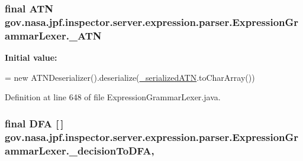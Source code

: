 \subsubsection[{\texorpdfstring{\+\_\+\+A\+TN}{_ATN}}]{\setlength{\rightskip}{0pt plus 5cm}final A\+TN gov.\+nasa.\+jpf.\+inspector.\+server.\+expression.\+parser.\+Expression\+Grammar\+Lexer.\+\_\+\+A\+TN\hspace{0.3cm}{\ttfamily [static]}}\hypertarget{classgov_1_1nasa_1_1jpf_1_1inspector_1_1server_1_1expression_1_1parser_1_1_expression_grammar_lexer_a01682bbb89e1c13f1f5df9764056ae9a}{}\label{classgov_1_1nasa_1_1jpf_1_1inspector_1_1server_1_1expression_1_1parser_1_1_expression_grammar_lexer_a01682bbb89e1c13f1f5df9764056ae9a}
{\bfseries Initial value\+:}
\begin{DoxyCode}
=
    \textcolor{keyword}{new} ATNDeserializer().deserialize(\hyperlink{classgov_1_1nasa_1_1jpf_1_1inspector_1_1server_1_1expression_1_1parser_1_1_expression_grammar_lexer_ae46ea6995c32b4f2babb38ae606c04e9}{\_serializedATN}.toCharArray())
\end{DoxyCode}


Definition at line 648 of file Expression\+Grammar\+Lexer.\+java.

\subsubsection[{\texorpdfstring{\+\_\+decision\+To\+D\+FA}{_decisionToDFA}}]{\setlength{\rightskip}{0pt plus 5cm}final D\+FA \mbox{[}$\,$\mbox{]} gov.\+nasa.\+jpf.\+inspector.\+server.\+expression.\+parser.\+Expression\+Grammar\+Lexer.\+\_\+decision\+To\+D\+FA\hspace{0.3cm}{\ttfamily [static]}, {\ttfamily [protected]}}\hypertarget{classgov_1_1nasa_1_1jpf_1_1inspector_1_1server_1_1expression_1_1parser_1_1_expression_grammar_lexer_a9e313cfd9e7a77d4944605bb18645406}{}\label{classgov_1_1nasa_1_1jpf_1_1inspector_1_1server_1_1expression_1_1parser_1_1_expression_grammar_lexer_a9e313cfd9e7a77d4944605bb18645406}


